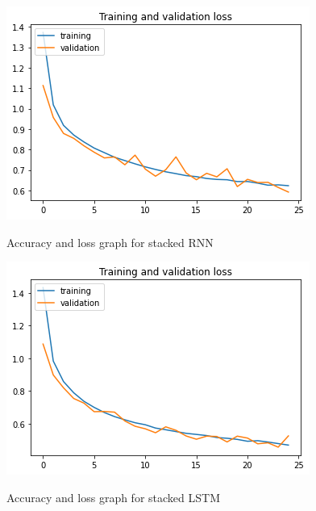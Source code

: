 \documentclass[12pt,oneside,geqno]{article}
\begin{document}
	\begin{figure}
		\centering
		\includegraphics[width=\textwidth]{../figs/stacked_rnn_results.png}
		\label{fig:rnn}
		\caption{Accuracy and loss graph for stacked RNN}
	\end{figure}
	\begin{figure}
		\centering
		\includegraphics[width=\textwidth]{../figs/stacked_lstm_results.png}
		\label{fig:lstm}
		\caption{Accuracy and loss graph for stacked LSTM}
	\end{figure}
\end{document}
